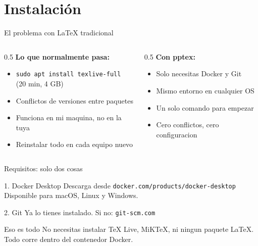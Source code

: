 \section{Instalación}

\begin{frame}{El problema con LaTeX tradicional}
  \begin{columns}[T]
    \begin{column}{0.5\textwidth}
      \textbf{Lo que normalmente pasa:}
      \begin{itemize}
        \item \texttt{sudo apt install texlive-full} \\ {\small (20 min, 4 GB)}
        \item Conflictos de versiones entre paquetes
        \item Funciona en mi maquina, no en la tuya
        \item Reinstalar todo en cada equipo nuevo
      \end{itemize}
    \end{column}
    \begin{column}{0.5\textwidth}
      \textbf{Con pptex:}
      \begin{itemize}
        \item Solo necesitas \alert{Docker} y \alert{Git}
        \item Mismo entorno en cualquier OS
        \item Un solo comando para empezar
        \item Cero conflictos, cero configuracion
      \end{itemize}
    \end{column}
  \end{columns}
\end{frame}

\begin{frame}[fragile]{Requisitos: solo dos cosas}
  \begin{block}{1. Docker Desktop}
    Descarga desde \texttt{docker.com/products/docker-desktop} \\
    Disponible para macOS, Linux y Windows.
  \end{block}

  \vspace{0.8em}

  \begin{block}{2. Git}
    Ya lo tienes instalado. Si no: \texttt{git-scm.com}
  \end{block}

  \vspace{0.8em}
  \begin{alertblock}{Eso es todo}
    No necesitas instalar TeX Live, MiKTeX, ni ningun paquete LaTeX.
    Todo corre dentro del contenedor Docker.
  \end{alertblock}
\end{frame}

